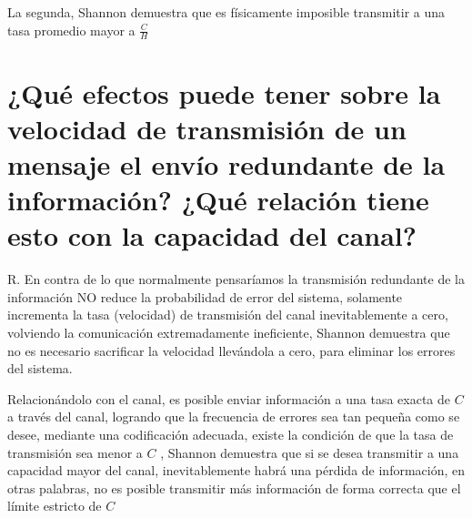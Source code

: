 La segunda, Shannon demuestra que es físicamente imposible transmitir a una tasa promedio mayor a $\frac{C}{H}$ 
\section{¿Qué efectos puede tener sobre la velocidad de transmisión de un mensaje el envío redundante de la información? ¿Qué relación tiene esto con la capacidad del canal?}
R. En contra de lo que normalmente pensaríamos la transmisión redundante de la información NO reduce la probabilidad de error del sistema, solamente incrementa la tasa (velocidad) de transmisión del canal inevitablemente a cero, volviendo la comunicación extremadamente ineficiente, Shannon demuestra que no es necesario sacrificar la velocidad llevándola a cero, para eliminar los errores del sistema.

Relacionándolo con el canal, es posible enviar información a una tasa exacta de $C$ a través del canal, logrando que la frecuencia de errores sea tan pequeña como se desee, mediante una codificación adecuada, existe la condición de que la tasa de transmisión sea menor a $C$ , Shannon demuestra que si se desea transmitir a una capacidad mayor del canal, inevitablemente habrá una pérdida de información, en otras palabras, no es posible transmitir más información de forma correcta que el límite estricto de $C$ 